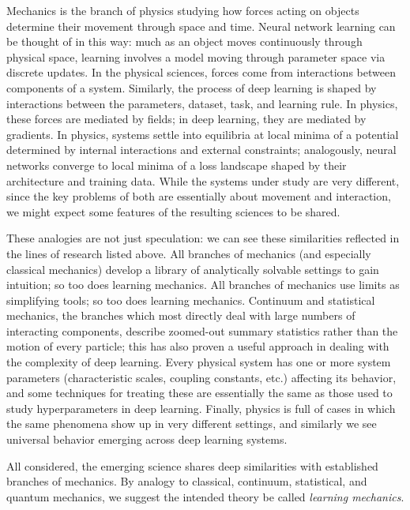 Mechanics is the branch of physics studying how forces acting on objects determine their movement through space and time.
Neural network learning can be thought of in this way: much as an object moves continuously through physical space, learning involves a model moving through parameter space via discrete updates.
In the physical sciences, forces come from interactions between components of a system.
Similarly, the process of deep learning is shaped by interactions between the parameters, dataset, task, and learning rule.
In physics, these forces are mediated by fields; in deep learning, they are mediated by gradients.
In physics, systems settle into equilibria at local minima of a potential determined by internal interactions and external constraints; analogously, neural networks converge to local minima of a loss landscape shaped by their architecture and training data.
While the systems under study are very different, since the key problems of both are essentially about movement and interaction, we might expect some features of the resulting sciences to be shared.

These analogies are not just speculation: we can see these similarities reflected in the lines of research listed above.
All branches of mechanics (and especially classical mechanics) develop a library of analytically solvable settings to gain intuition; so too does learning mechanics.
All branches of mechanics use limits as simplifying tools; so too does learning mechanics.
Continuum and statistical mechanics, the branches which most directly deal with large numbers of interacting components, describe zoomed-out summary statistics rather than the motion of every particle; this has also proven a useful approach in dealing with the complexity of deep learning.
Every physical system has one or more system parameters (characteristic scales, coupling constants, etc.) affecting its behavior, and some techniques for treating these are essentially the same as those used to study hyperparameters in deep learning.
Finally, physics is full of cases in which the same phenomena show up in very different settings, and similarly we see universal behavior emerging across deep learning systems.

All considered, the emerging science shares deep similarities with established branches of mechanics.
By analogy to classical, continuum, statistical, and quantum mechanics, we suggest the intended theory be called \textit{learning mechanics}.





















